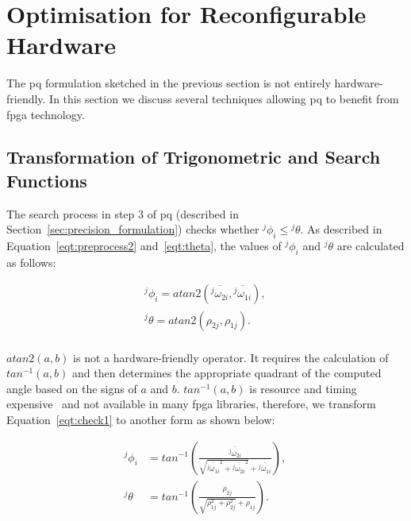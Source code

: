 \section{Optimisation for Reconfigurable Hardware}
\label{sec:precision_optimisation}

The \gls{pq} formulation sketched in the previous section is not entirely hardware-friendly.
In this section we discuss several techniques allowing \gls{pq} to benefit from \gls{fpga} technology.

\subsection{Transformation of Trigonometric and Search Functions}
\label{sec:precision_trigo}
The search process in step 3 of \gls{pq} (described in Section~\ref{sec:precision_formulation}) checks whether \linebreak ${^j\phi}_i \le {^j\theta}$.
As described in Equation~\ref{eqt:preprocess2} and~\ref{eqt:theta}, the values of ${^j\phi}_i$ and ${^j\theta}$ are calculated as follows:

\begin{equation}
\begin{aligned}
{^j\phi}_i = atan2 \left ( \overline{{^j\omega}_{2i}},\overline{{^j\omega}_{1i}} \right ) \mbox{, } \\
{^j\theta} = atan2 \left ( \rho_{2j},\rho_{1j} \right ) \mbox{.} \\
\end{aligned}
\label{eqt:check1}
\end{equation}

$atan2(a,b)$ is not a hardware-friendly operator.
It requires the calculation of $tan^{-1}(a,b)$ and then determines the appropriate quadrant of the computed angle based on the signs of $a$ and $b$.
$tan^{-1}(a,b)$ is resource and timing expensive~\cite{altera_megafunctions} and not available in many \gls{fpga} libraries, therefore, we transform Equation~\ref{eqt:check1} to another form as shown below:

\begin{equation}
\begin{aligned}
{^j\phi}_i &= tan^{-1} \left ( \frac{\overline{{^j\omega}_{2i}}}{\sqrt{\overline{{^j\omega}_{1i}}^2+\overline{{^j\omega}_{2i}}^2}+\overline{{^j\omega}_{1i}}} \right ) \mbox{, } \\
{^j\theta} &= tan^{-1} \left ( \frac{\rho_{2j}}{\sqrt{\rho_{1j}^2+\rho_{2j}^2}+\rho_{1j}} \right ) \mbox{.}
\end{aligned}
\label{eqt:check2}
\end{equation}

